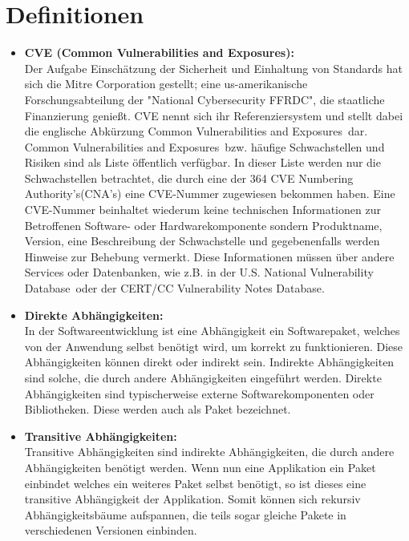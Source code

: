 \section{Definitionen} \label{sec:Definitionen}
\begin{itemize}
    \item \textbf{CVE (Common Vulnerabilities and Exposures):} \\
    
    Der Aufgabe Einschätzung der Sicherheit und Einhaltung von Standards hat sich die Mitre Corporation gestellt; eine us-amerikanische Forschungsabteilung der "National Cybersecurity FFRDC", die staatliche Finanzierung genießt.
    CVE nennt sich ihr Referenziersystem und stellt dabei die englische Abkürzung \glqq Common Vulnerabilities and Exposures\grqq~dar.
    \\
    \glqq Common Vulnerabilities and Exposures\grqq~bzw. häufige Schwachstellen und Risiken sind als Liste öffentlich verfügbar.
    In dieser Liste werden nur die Schwachstellen betrachtet, die durch eine der 364 \glqq CVE Numbering Authority's\grqq (CNA's) eine CVE-Nummer zugewiesen bekommen haben.\cite{}
    Eine CVE-Nummer beinhaltet wiederum keine technischen Informationen zur Betroffenen Software- oder Hardwarekomponente sondern Produktname, Version, eine Beschreibung der Schwachstelle und gegebenenfalls werden Hinweise zur Behebung vermerkt.
    Diese Informationen müssen über andere Services oder Datenbanken, wie z.B. in der \glqq U.S. National Vulnerability Database\grqq~oder der \glqq CERT/CC Vulnerability Notes Database\grqq.

    \item \textbf{Direkte Abhängigkeiten:} \\
    In der Softwareentwicklung ist eine Abhängigkeit ein Softwarepaket, welches von der Anwendung selbst benötigt wird, um korrekt zu funktionieren.
    Diese Abhängigkeiten können direkt oder indirekt sein.
    Indirekte Abhängigkeiten sind solche, die durch andere Abhängigkeiten eingeführt werden.
    Direkte Abhängigkeiten sind typischerweise externe Softwarekomponenten oder Bibliotheken.
    Diese werden auch als Paket bezeichnet. 

    \item \textbf{Transitive Abhängigkeiten:} \\
    Transitive Abhängigkeiten sind indirekte Abhängigkeiten, die durch andere Abhängigkeiten benötigt werden.
    Wenn nun eine Applikation ein Paket einbindet welches ein weiteres Paket selbst benötigt, so ist dieses eine transitive Abhängigkeit der Applikation.
    Somit können sich rekursiv Abhängigkeitsbäume aufspannen, die teils sogar gleiche Pakete in verschiedenen Versionen einbinden.
    

\end{itemize}
